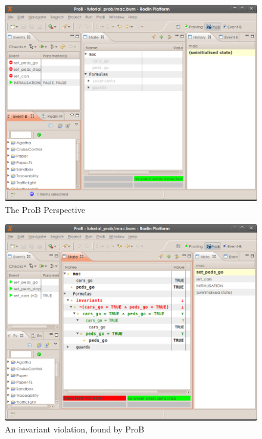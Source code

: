 \begin{figure}[!ht]
\begin{center}
	\includegraphics[]{img/tutorial/tut_03_prob_perspective.png}
	\caption{The ProB Perspective}
	\label{fig_tut_prob_perspective}
\end{center}
\end{figure}

\begin{figure}[!ht]
\begin{center}
	\includegraphics[]{img/tutorial/tut_03_prob_invariant_violation.png}
	\caption{An invariant violation, found by ProB}
	\label{tut_03_prob_invariant_violation}
\end{center}
\end{figure}


